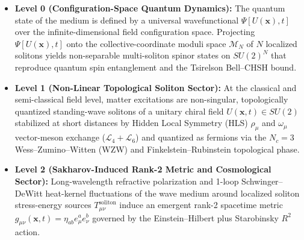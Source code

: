 \documentclass[10pt,aps,prd,twocolumn,superscriptaddress,nofootinbib,floatfix,longbibliography,showkeys]{revtex4-2}
\begin{document}
\begin{itemize}
  \item \textbf{Level 0 (Configuration-Space Quantum Dynamics):} The quantum state of the medium is defined by a universal wavefunctional $\Psi[U(\mathbf{x}), t]$ over the infinite-dimensional field configuration space. Projecting $\Psi[U(\mathbf{x}), t]$ onto the collective-coordinate moduli space $\mathcal{M}_N$ of $N$ localized solitons yields non-separable multi-soliton spinor states on $SU(2)^N$ that reproduce quantum spin entanglement and the Tsirelson Bell--CHSH bound.
  \item \textbf{Level 1 (Non-Linear Topological Soliton Sector):} At the classical and semi-classical field level, matter excitations are non-singular, topologically quantized standing-wave solitons of a unitary chiral field $U(\mathbf{x}, t) \in SU(2)$ stabilized at short distances by Hidden Local Symmetry (HLS) $\rho_\mu$ and $\omega_\mu$ vector-meson exchange ($\mathcal{L}_4 + \mathcal{L}_6$) and quantized as fermions via the $N_c = 3$ Wess--Zumino--Witten (WZW) and Finkelstein--Rubinstein topological phase.
  \item \textbf{Level 2 (Sakharov-Induced Rank-2 Metric and Cosmological Sector):} Long-wavelength refractive polarization and 1-loop Schwinger--DeWitt heat-kernel fluctuations of the wave medium around localized soliton stress-energy sources $T_{\mu\nu}^{\text{soliton}}$ induce an emergent rank-2 spacetime metric $g_{\mu\nu}(\mathbf{x}, t) = \eta_{ab} e^a_\mu e^b_\nu$ governed by the Einstein--Hilbert plus Starobinsky $R^2$ action.

\end{itemize}
\end{document}
